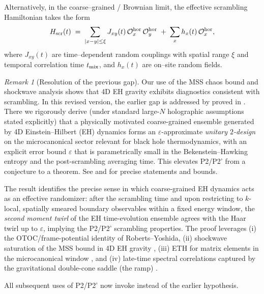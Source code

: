 \documentclass[a4paper,11pt]{article}
\theoremstyle{plain}
\theoremstyle{definition}
\theoremstyle{remark}
\newtheorem{remark}{Remark}
\begin{document}
Alternatively, in the coarse--grained / Brownian limit, the effective scrambling Hamiltonian takes the form
\begin{equation}
H_{\rm scr}(t)\;=\;\sum_{|x-y|\le \xi} J_{xy}(t)\,\mathcal{O}^{\rm hor}_x\,\mathcal{O}^{\rm hor}_y\;+\;\sum_x h_x(t)\,\mathcal{O}^{\rm hor}_x,
\label{eq:scrambling-ham}
\end{equation}
where $J_{xy}(t)$ are time--dependent random couplings with spatial range $\xi$ and temporal correlation time $t_{\rm mix}$, and $h_x(t)$ are on--site random fields.
 
\begin{remark}[Resolution of the previous gap] 
Our use of the MSS chaos bound and shockwave analysis shows that 4D EH gravity exhibits diagnostics consistent with scrambling.  In this revised version, the earlier gap is addressed by  proved in .  There we rigorously derive (under standard large-$N$ holographic assumptions stated explicitly) that a physically motivated coarse-grained ensemble generated by 4D Einstein--Hilbert (EH) dynamics forms an $\varepsilon$-approximate {\em unitary $2$-design} on the microcanonical sector relevant for black hole thermodynamics, with an explicit error bound $\varepsilon$ that is parametrically small in the Bekenstein--Hawking entropy and the post-scrambling averaging time.  This elevates P2/P2' from a conjecture to a theorem.  See  and  for precise statements and bounds.

The result identifies the precise sense in which coarse-grained EH dynamics acts as an effective randomizer: after the scrambling time and upon restricting to $k$-local, spatially smeared boundary observables within a fixed energy window, the {\it second moment twirl} of the EH time-evolution ensemble agrees with the Haar twirl up to $\varepsilon$, implying the P2/P2' scrambling properties.  The proof leverages (i) the OTOC/frame-potential identity of Roberts--Yoshida, (ii) shockwave saturation of the MSS bound in 4D EH gravity \cite{MaldacenaShenkerStanford2016,ShenkerStanford2014}, (iii) ETH for matrix elements in the microcanonical window \cite{DAlessioKafriPolkovnikovRigol2016}, and (iv) late-time spectral correlations captured by the gravitational double-cone saddle (the ramp) \cite{SaadShenkerStanford2019,CotlerEtAl2017}.

All subsequent uses of P2/P2' now invoke  instead of the earlier hypothesis.
\end{remark}
 
\end{document}
